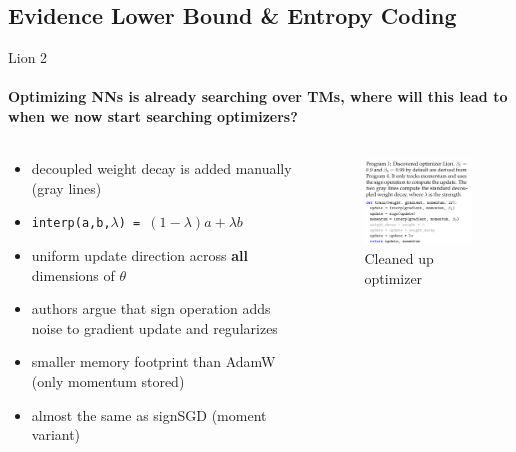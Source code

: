 \documentclass[
	11pt, %
	aspectratio=169, %
]{beamer}
\begin{document}
\subsection{Evidence Lower Bound \& Entropy Coding}


\begin{frame}{Lion 2}
	\framesubtitle{Optimizing NNs is already searching over TMs, where will this lead to when we now start searching optimizers?}
	 \begin{columns}[c] %
		\begin{column}{0.45\textwidth} %
				\begin{itemize}
					\item decoupled weight decay is added manually (gray lines)
					\item \texttt{interp(a,b,$\lambda$) = $(1-\lambda) a + \lambda b$ } 
					\item uniform update direction across \textbf{all} dimensions of $\theta$
					\item authors argue that sign operation adds noise to gradient update and regularizes
					\item smaller memory footprint than AdamW (only momentum stored)
					\item almost the same as signSGD (moment variant)
				\end{itemize}
		\end{column}
		\begin{column}{0.55\textwidth} %
        	\begin{figure}
        	    \centering
                \includegraphics[width=6.5cm]{figures/signMomentum.png}
        	    \caption*{Cleaned up optimizer }
        	\end{figure}
		\end{column}
	\end{columns}
\end{frame}
\end{document}
